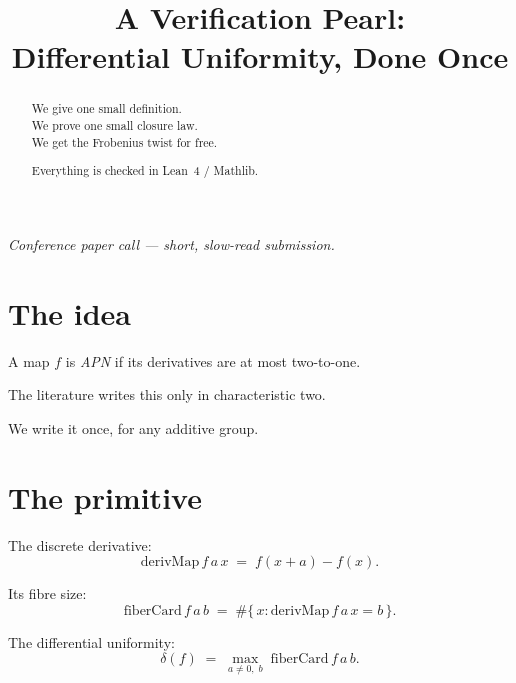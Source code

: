\documentclass[11pt]{article}
\title{\textbf{A Verification Pearl:\\[2pt]
Differential Uniformity, Done Once}}
\author{}
\date{}
\begin{document}
\maketitle

\thispagestyle{empty}

\begin{abstract}
\noindent
We give one small definition.\\
We prove one small closure law.\\
We get the Frobenius twist for free.

\medskip
\noindent
Everything is checked in Lean~4 / Mathlib.
\end{abstract}

\vfill

\noindent\textit{Conference paper call --- short, slow-read submission.}

\newpage


\section{The idea}

\bigskip

A map $f$ is \emph{APN} if its derivatives are at most two-to-one.

\bigskip

The literature writes this only in characteristic two.

\bigskip

We write it once, for any additive group.

\bigskip


\newpage


\section{The primitive}

\bigskip

The discrete derivative:
\[
  \mathrm{derivMap}\, f\, a\, x \;=\; f(x+a) - f(x).
\]

\bigskip

Its fibre size:
\[
  \mathrm{fiberCard}\, f\, a\, b \;=\; \#\{\, x : \mathrm{derivMap}\, f\, a\, x = b \,\}.
\]

\bigskip

The differential uniformity:
\[
  \delta(f) \;=\; \max_{a \neq 0,\; b}\; \mathrm{fiberCard}\, f\, a\, b.
\]

\bigskip
\end{document}

